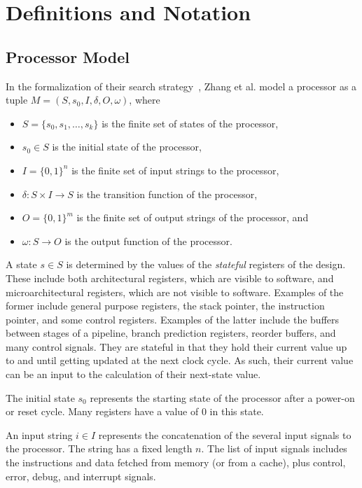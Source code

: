 \section{Definitions and Notation}
\subsection{Processor Model}
\label{sec:procmodel}
In the formalization of their search strategy~\cite{fmspaper}, Zhang et
al. model a processor as a tuple $M = (S, s_0, I, \delta, O, \omega)$, where
\begin{itemize}
  \item $S = \{s_0, s_1, \ldots, s_k\}$ is the finite set of states of the
    processor,
  \item $s_0 \in S$ is the initial state of the processor,
  \item $I = \{0,1\}^n$ is the finite set of input strings to the processor,
  \item $\delta: S \times I \rightarrow S$ is the transition function of the processor,
  \item $O = \{0,1\}^m$ is the finite set of output strings of the processor,
    and
  \item $\omega: S \rightarrow O$ is the output function of the processor.
\end{itemize}

A state $s \in S$ is determined by the values of the \emph{stateful} registers
of the design. These include both architectural registers, which are visible to
software, and microarchitectural registers, which are not visible to
software. Examples of the former include general purpose registers, the stack
pointer, the instruction pointer, and some control registers. Examples of the
latter include the buffers between stages of a pipeline, branch prediction
registers, reorder buffers, and many control signals. They are stateful in that
they hold their current value up to and until getting updated at the next clock
cycle. As such, their current value can be an input to the calculation of their
next-state value. 

The initial state $s_0$ represents the starting state of the processor after a
power-on or reset cycle. Many registers have a value of 0 in this state.

An input string $i \in I$ represents the concatenation of the several input
signals to the processor. The string has a fixed length $n$. The list of input
signals includes the instructions and data fetched from memory (or from a
cache), plus control, error, debug, and interrupt signals.

